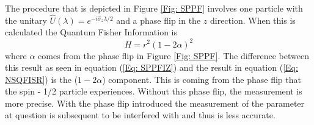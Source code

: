 \documentclass[twocolumn]{article}
\begin{document}
\par \noindent
The procedure that is depicted in Figure \ref{Fig: SPPF} involves one particle with the unitary $\hat{U}(\lambda)=e^{-i\hat{\sigma}_z\lambda/2}$ and a phase flip in the $z$ direction. When this is calculated the Quantum Fisher Information is
\begin{equation}\label{Eq: SPPFIZ}
H=r^2(1-2\alpha)^2
\end{equation}
where $\alpha$ comes from the phase flip in Figure \ref{Fig: SPPF}. The difference between this result as seen in equation (\ref{Eq: SPPFIZ}) and the result in equation (\ref{Eq: NSQFISR}) is the ($1-2\alpha$) component. This is coming from the phase flip that the spin - 1/2 particle experiences. Without this phase flip, the measurement is more precise. With the phase flip introduced the measurement of the parameter at question is subsequent to be interfered with and thus is less accurate.
\end{document}
